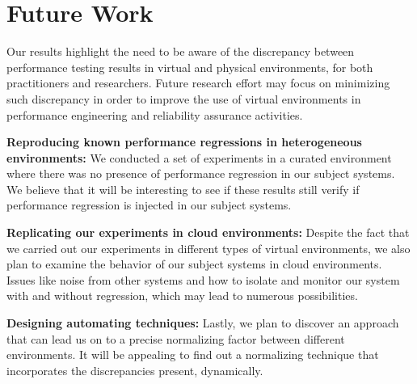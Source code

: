 \section{Future Work}

Our results highlight the need to be aware of the discrepancy between performance testing results in virtual and physical environments, for both practitioners and researchers. Future research effort may focus on minimizing such discrepancy in order to improve the use of virtual environments in performance engineering and reliability assurance activities.

\textbf{Reproducing known performance regressions in heterogeneous environments:}
We conducted a set of experiments in a curated environment where there was no presence of performance regression in our subject systems. We believe that it will be interesting to see if these results still verify if performance regression is injected in our subject systems.

\textbf{Replicating our experiments in cloud environments:}
Despite the fact that we carried out our experiments in different types of virtual environments, we also plan to examine the behavior of our subject systems in cloud environments. Issues like noise from other systems and how to isolate and monitor our system with and without regression, which may lead to numerous possibilities.


\textbf{Designing automating techniques:}
Lastly, we plan to discover an approach that can lead us on to a precise normalizing factor between different environments. It will be appealing to find out a normalizing technique that incorporates the discrepancies present, dynamically.
